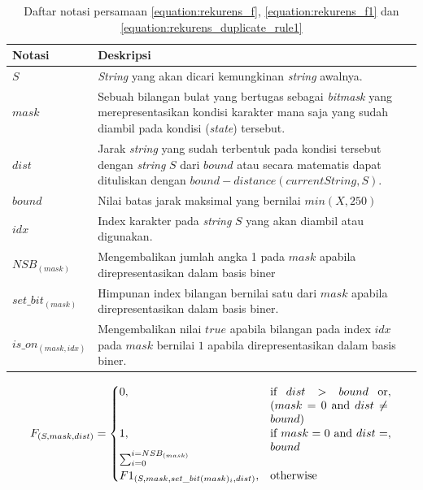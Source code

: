 \begin{table}
	\centering
	\begin{tabular} {|p{3cm}|p{5cm}|} \hline
		Notasi & Deskripsi\\ \hline
		$ S $ & \textit{String} yang akan dicari kemungkinan \textit{string} awalnya.\\ \hline
		$ mask $ & Sebuah bilangan bulat yang bertugas sebagai \textit{bitmask} yang merepresentasikan kondisi karakter mana saja yang sudah diambil pada kondisi (\textit{state}) tersebut.\\ \hline
		$ dist $ & Jarak \textit{string} yang sudah terbentuk pada kondisi tersebut dengan \textit{string} $ S $ dari $ bound $ atau secara matematis dapat dituliskan dengan $ bound - distance(currentString, S) $.\\ \hline
		$ bound $ & Nilai batas jarak maksimal yang bernilai $ min(X, 250) $\\ \hline
		$ idx $ & Index karakter pada \textit{string} $ S $ yang akan diambil atau digunakan.\\ \hline
		$ NSB_{(mask)} $ & Mengembalikan jumlah angka 1 pada $ mask $ apabila direpresentasikan dalam basis biner\\ \hline
		$ set\_bit_{(mask)} $ & Himpunan index bilangan bernilai satu dari $ mask $ apabila direpresentasikan dalam basis biner.\\ \hline
		$ is\_on_{(mask, idx)} $ & Mengembalikan nilai $ true $ apabila bilangan pada index $ idx $ pada $ mask $ bernilai $ 1 $ apabila direpresentasikan dalam basis biner.\\ \hline
	\end{tabular}\caption{Daftar notasi persamaan \ref{equation:rekurens_f}, \ref{equation:rekurens_f1} dan \ref{equation:rekurens_duplicate_rule1}}
	\label{tab:daftar_notasi_f}
\end{table}

\begin{equation}
F_{(S, mask, dist)} = \begin{cases}
0, & \parbox[t]{.3\textwidth}{if $dist > bound$ or ($mask=0$ and $dist \neq bound$)}, \\
1, & \parbox[t]{.3\textwidth}{if $mask=0$ and $dist=bound$}, \\
\sum_{i=0}^{i=NSB_{(mask)}} \\F1_{(S, mask,
	set\_bit(mask)_{i}, dist)} ,& \text{otherwise}
\end{cases}
\label{equation:rekurens_f}
\end{equation}



